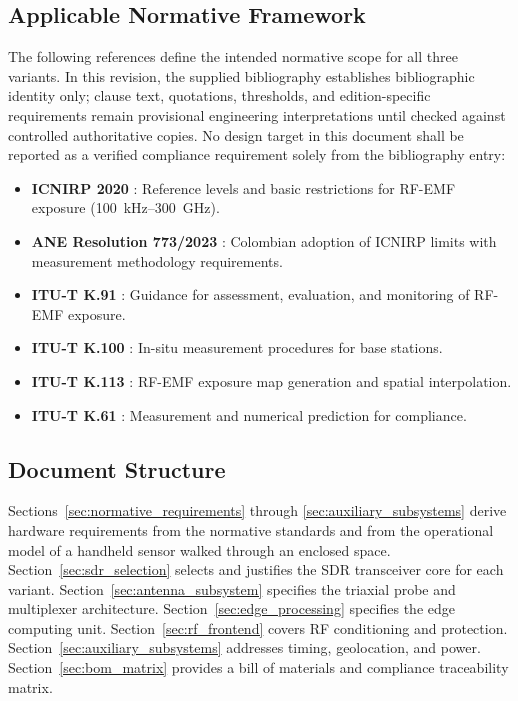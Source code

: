 \documentclass[11pt,a4paper]{article}
\begin{document}
\subsection{Applicable Normative Framework}

The following references define the intended normative scope for all three variants. In this revision, the supplied bibliography establishes bibliographic identity only; clause text, quotations, thresholds, and edition-specific requirements remain provisional engineering interpretations until checked against controlled authoritative copies. No design target in this document shall be reported as a verified compliance requirement solely from the bibliography entry:

\begin{itemize}
    \item \textbf{ICNIRP 2020} \cite{icnirp2020}: Reference levels and basic restrictions for RF-EMF exposure (100~kHz--300~GHz).
    \item \textbf{ANE Resolution 773/2023} \cite{ane_res773_2023}: Colombian adoption of ICNIRP limits with measurement methodology requirements.
    \item \textbf{ITU-T K.91} \cite{itut_k91}: Guidance for assessment, evaluation, and monitoring of RF-EMF exposure.
    \item \textbf{ITU-T K.100} \cite{itut_k100}: In-situ measurement procedures for base stations.
    \item \textbf{ITU-T K.113} \cite{itut_k113}: RF-EMF exposure map generation and spatial interpolation.
    \item \textbf{ITU-T K.61} \cite{itut_k61}: Measurement and numerical prediction for compliance.
\end{itemize}

\subsection{Document Structure}

Sections~\ref{sec:normative_requirements} through \ref{sec:auxiliary_subsystems} derive hardware requirements from the normative standards and from the operational model of a handheld sensor walked through an enclosed space. Section~\ref{sec:sdr_selection} selects and justifies the SDR transceiver core for each variant. Section~\ref{sec:antenna_subsystem} specifies the triaxial probe and multiplexer architecture. Section~\ref{sec:edge_processing} specifies the edge computing unit. Section~\ref{sec:rf_frontend} covers RF conditioning and protection. Section~\ref{sec:auxiliary_subsystems} addresses timing, geolocation, and power. Section~\ref{sec:bom_matrix} provides a bill of materials and compliance traceability matrix.
\end{document}
